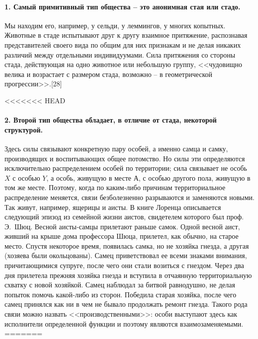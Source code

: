 \documentclass{book}
\begin{document}
\paragraph{1. Самый примитивный тип общества -- это анонимная стая или стадо.}  Мы находим его, например, у сельди, у леммингов, у многих копытных. Животные в стаде испытывают друг к другу взаимное притяжение, распознавая представителей своего вида по общим для них признакам и не делая никаких разли­чий между отдельными индивидуумами. Сила притяжения со стороны стада, действующая на одно животное или неболь­шую группу, <<чудовищно велика и возрастает с размером стада, возможно -- в геометрической прогрессии>>.[28]

<<<<<<< HEAD
\paragraph{2. Второй тип общества обладает, в отличие от стада, неко­торой структурой.} Здесь силы связывают конкретную пару особей, а именно самца и самку, производящих и воспитываю­щих общее потомство. Но силы эти определяются исключитель­но распределением особей по территории; сила связывает не особь $X$  с особью $Y$, а особь, живущую в месте $А$, с особью другого пола, живущую в том же месте. Поэтому, когда по каким‑либо причинам территориальное распределение меняет­ся, связи безболезненно разрываются и заменяются новыми. Так живут, например, ящерицы и аисты. В книге Лоренца описы­вается следующий эпизод из семейной жизни аистов, свидете­лем которого был проф. Э.~Шюц. Весной аисты‑самцы прилетают раньше самок. Одной весной аист, живший на крыше дома профессора Шюца, прилетел, как обычно, на старое место. Спустя некоторое время, появилась самка, но не хозяйка гнезда, а другая (хозяева были окольцованы). Самец приветствовал ее всеми знаками внимания, причитающимися супруге, после чего они стали возиться с гнездом. Через два дня прилетела прежняя хозяйка гнезда и вступила в отчаянную территориальную схватку с новой хозяйкой. Самец наблюдал за битвой равнодушно, не делая попыток помочь какой‑либо из сторон. Победила старая хозяйка, после чего самец принялся как ни в чем не бывало продолжать ремонт гнезда. Такого рода связи можно назвать <<производственными>>: особи выступают здесь как исполнители определенной функции и поэтому являются взаимозаменяемыми.
=======
\end{document}
